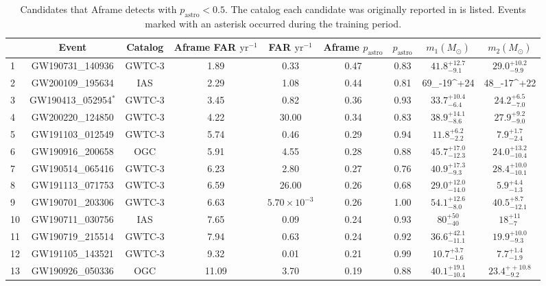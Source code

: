 \begin{table*}[ht]
\centering
\caption{Candidates that Aframe detects with $p_\mathrm{astro} < 0.5$. The catalog each candidate was originally reported in is listed. Events marked with an asterisk occurred during the training period.}
\label{table:non_significant}
\begin{tabular}{!{\vrule width 1pt}lcccccccc!{\vrule width 1pt}}
\toprule[1pt]
 & Event & Catalog & Aframe FAR $\mathrm{yr}^{-1}$ & FAR $\mathrm{yr}^{-1}$ & Aframe $p_\mathrm{astro}$ & $p_\mathrm{astro}$ & $m_1 (M_{\odot})$ & $m_2 (M_{\odot})$ \\
 & GW190731\_140936 & GWTC-3 & 1.89 & 0.33 & 0.47 & 0.83 & $41.8^{+12.7}_{-9.1}$ & $29.0^{+10.2}_{-9.9}$ \\
2 & GW200109\_195634 & IAS & 2.29 & 1.08 & 0.44 & 0.81 & 69_{-19}^{+24} & 48_{-17}^{+22} \\
3 & GW190413\_052954$^{*}$ & GWTC-3 & 3.45 & 0.82 & 0.36 & 0.93 & $33.7^{+10.4}_{-6.4}$ & $24.2^{+6.5}_{-7.0}$ \\
4 & GW200220\_124850 & GWTC-3 & 4.22 & 30.00 & 0.34 & 0.83 & $38.9^{+14.1}_{-8.6}$ & $27.9^{+9.2}_{-9.0}$ \\
5 & GW191103\_012549 & GWTC-3 & 5.74 & 0.46 & 0.29 & 0.94 & $11.8^{+6.2}_{-2.2}$ & $7.9^{+1.7}_{-2.4}$ \\
6 & GW190916\_200658 & OGC & 5.91 & 4.55 & 0.28 & 0.88 & $45.7^{+17.0}_{-12.3}$ & $24.0^{+13.2}_{-10.4}$ \\
7 & GW190514\_065416 & GWTC-3 & 6.23 & 2.80 & 0.27 & 0.76 & $40.9^{+17.3}_{-9.3}$ & $28.4^{+10.0}_{-10.1}$ \\
8 & GW191113\_071753 & GWTC-3 & 6.59 & 26.00 & 0.26 & 0.68 & $29.0^{+12.0}_{-14.0}$ & $5.9^{+4.4}_{-1.3}$ \\
9 & GW190701\_203306 & GWTC-3 & 6.63 & $5.70 \times 10^{-3}$ & 0.26 & 1.00 & $54.1^{+12.6}_{-8.0}$ & $40.5^{+8.7}_{-12.1}$ \\
10 & GW190711\_030756 & IAS & 7.65 & 0.09 & 0.24 & 0.93 & $80_{-40}^{+50}$ & $18_{-7}^{+11}$ \\
11 & GW190719\_215514 & GWTC-3 & 7.94 & 0.63 & 0.24 & 0.92 & $36.6^{+42.1}_{-11.1}$ & $19.9^{+10.0}_{-9.3}$ \\
12 & GW191105\_143521 & GWTC-3 & 9.32 & 0.01 & 0.21 & 0.99 & $10.7^{+3.7}_{-1.6}$ & $7.7^{+1.4}_{-1.9}$ \\
13 & GW190926\_050336 & OGC & 11.09 & 3.70 & 0.19 & 0.88 & $40.1^{+19.1}_{-10.4}$ & $23.4^{++10.8}_{-9.2}$ \\

\end{tabular}
\end{table*}
